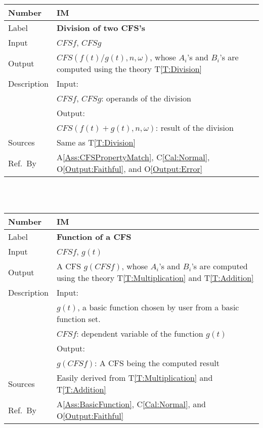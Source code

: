 \documentclass[12pt]{article}
\newcommand{\colAwidth}{0.13\textwidth}
\newcommand{\colBwidth}{0.82\textwidth}
\newcommand{\tref}[1]{T\ref{#1}}
\newcounter{instnum} %
\newcommand{\aref}[1]{A\ref{#1}}
\newcommand{\calref}[1]{C\ref{#1}}
\newcommand{\oref}[1]{O\ref{#1}}
\begin{document}
\noindent
\begin{minipage}{\textwidth}
	\renewcommand*{\arraystretch}{1.5}
	\begin{tabular}{| p{\colAwidth} | p{\colBwidth}|}
		\hline
		\rowcolor[gray]{0.9}
		Number& IM{instnum}\theinstnum 
		\label{IM:Division}\\
		\hline
		Label& \bf Division of two CFS's \\
		\hline
		Input& $\mathit{CFSf}$, $\mathit{CFSg}$\\
		\hline
		Output& $\mathit{CFS}(f(t)/g(t), n, \omega)$, whose $A_i$'s 
		and $B_i$'s are computed using the theory 
		\tref{T:Division}\\
		\hline
		Description&Input:\\
		&$\mathit{CFSf}$, $\mathit{CFSg}$: operands of 
		the division\\
		&Output:\\
		& $\mathit{CFS}(f(t)+g(t), n, \omega)$: result of 
		the division\\
		\hline
		Sources&Same as \tref{T:Division}		\\
		\hline
		Ref.\ By & \aref{Ass:CFSPropertyMatch}, 
		\calref{Cal:Normal}, 
		\oref{Output:Faithful}, and \oref{Output:Error}\\
		\hline
	\end{tabular}
\end{minipage}\\
~\newline

\noindent
\begin{minipage}{\textwidth}
	\renewcommand*{\arraystretch}{1.5}
	\begin{tabular}{| p{\colAwidth} | p{\colBwidth}|}
		\hline
		\rowcolor[gray]{0.9}
		Number& IM{instnum}\theinstnum 
		\label{IM:Function}\\
		\hline
		Label& \bf Function of a CFS \\
		\hline
		Input& $\mathit{CFSf}$, $g(t)$\\
		\hline
		Output& A CFS $g(CFSf)$, whose $A_i$'s and $B_i$'s 
		are computed using the theory \tref{T:Multiplication} 
		and \tref{T:Addition}\\
		\hline
		Description&Input:\\
		& $g(t)$, a basic function chosen by user from a 
		basic function set.\\
		&$\mathit{CFSf}$: dependent variable of the function $g(t)$\\
		&Output:\\
		& $g(CFSf)$: A CFS being the computed result\\
		\hline
		Sources&Easily derived from \tref{T:Multiplication} 
		and \tref{T:Addition}\\
		\hline
		Ref.\ By & \aref{Ass:BasicFunction}, \calref{Cal:Normal}, 
		and \oref{Output:Faithful}\\
		\hline
	\end{tabular}
\end{minipage}\\
~\newline
\end{document}
